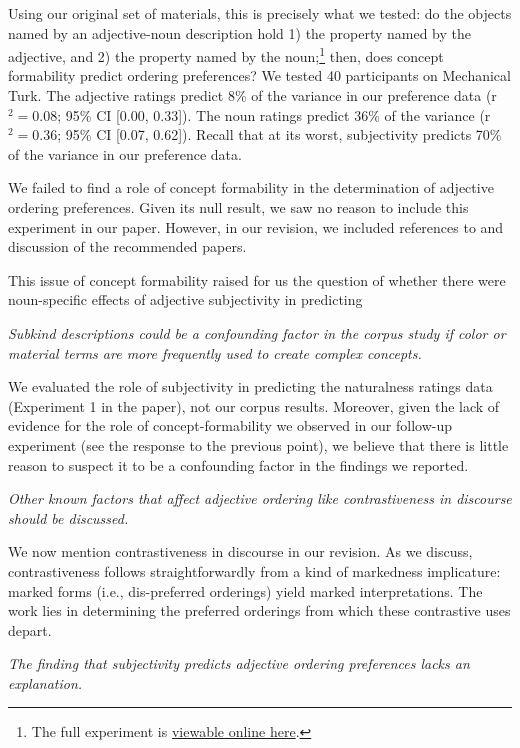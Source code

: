 \documentclass[12pt]{article}
\begin{document}
Using our original set of materials, this is precisely what we tested: do the objects named by an adjective-noun description hold 1) the property named by the adjective, and 2) the property named by the noun;\footnote{The full experiment is \href{http://web.stanford.edu/~scontras/adjective_ordering/experiments/9-concept-formability/concept-formability.html}{viewable online here}.} then, does concept formability predict ordering preferences? We tested 40 participants on Mechanical Turk. The adjective ratings predict 8\% of the variance in our preference data (r$^{2}=0.08$; 95\% CI [0.00,  0.33]). The noun ratings predict 36\% of the variance (r$^{2}=0.36$; 95\% CI [0.07,  0.62]). Recall that at its worst, subjectivity predicts 70\% of the variance in our preference data.

We failed to find a role of concept formability in the determination of adjective ordering preferences. Given its null result, we saw no reason to include this experiment in our paper. However, in our revision, we included references to and discussion of the recommended papers.

This issue of concept formability raised for us the question of whether there were noun-specific effects of adjective subjectivity in predicting 


\item  \emph{Subkind descriptions could be a confounding factor in the corpus study if color or material terms are more frequently used to create complex concepts.}

We evaluated the role of subjectivity in predicting the naturalness ratings data (Experiment 1 in the paper), not our corpus results. Moreover, given the lack of evidence for the role of concept-formability we observed in our follow-up experiment (see the response to the previous point), we believe that there is little reason to suspect it to be a confounding factor in the findings we reported.


\item \emph{Other known factors that affect adjective ordering like contrastiveness in discourse should be discussed.}

We now mention contrastiveness in discourse in our revision. As we discuss, contrastiveness follows straightforwardly from a kind of markedness implicature: marked forms (i.e., dis-preferred orderings) yield marked interpretations. The work lies in determining the preferred orderings from which these contrastive uses depart.


\item \emph{The finding that subjectivity predicts adjective ordering preferences lacks an explanation.}
\end{document}
